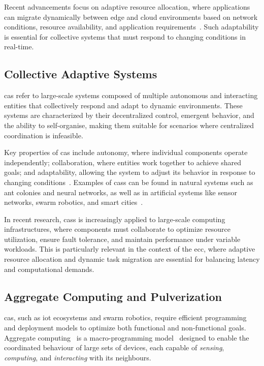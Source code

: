 \documentclass[runningheads]{llncs}
\begin{document}
Recent advancements focus on adaptive resource allocation,
where applications can migrate dynamically between edge and cloud environments based on network conditions,
resource availability,
and application requirements~\cite{DBLP:journals/fgcs/RomanLM18}.
%
Such adaptability is essential for collective systems that must respond to changing conditions in real-time.

\subsection{Collective Adaptive Systems}
\label{sec:cas}

\Ac{cas} refer to large-scale systems composed of multiple autonomous and interacting entities that collectively respond and adapt to dynamic environments.
%
These systems are characterized by their decentralized control,
emergent behavior,
and the ability to self-organise,
making them suitable for scenarios where centralized coordination is infeasible.

Key properties of \ac{cas} include autonomy,
where individual components operate independently;
collaboration,
where entities work together to achieve shared goals;
and adaptability,
allowing the system to adjust its behavior in response to changing conditions~\cite{DBLP:conf/birthday/BucchiaroneM19}.
%
Examples of \acp{cas} can be found in natural systems such as ant colonies and neural networks,
as well as in artificial systems like sensor networks,
swarm robotics,
and smart cities~\cite{DBLP:books/daglib/0023784}.

In recent research,
\acp{cas} is increasingly applied to large-scale computing infrastructures,
where components must collaborate to optimize resource utilization,
ensure fault tolerance,
and maintain performance under variable workloads.
%
This is particularly relevant in the context of the \ac{ecc},
where adaptive resource allocation and dynamic task migration are essential for balancing latency and computational demands.

\subsection{Aggregate Computing and Pulverization}
\label{sec:aggregate-computing}

\Ac{cas},
such as \ac{iot} ecosystems and swarm robotics,
require efficient programming and deployment models to optimize both functional and non-functional goals.
%
Aggregate computing~\cite{DBLP:journals/computer/BealPV15} is a macro-programming model~\cite{DBLP:journals/csur/Casadei23} designed to enable the coordinated behaviour of large sets of devices,
each capable of \emph{sensing},
\emph{computing},
and \emph{interacting} with its neighbours.
\end{document}
